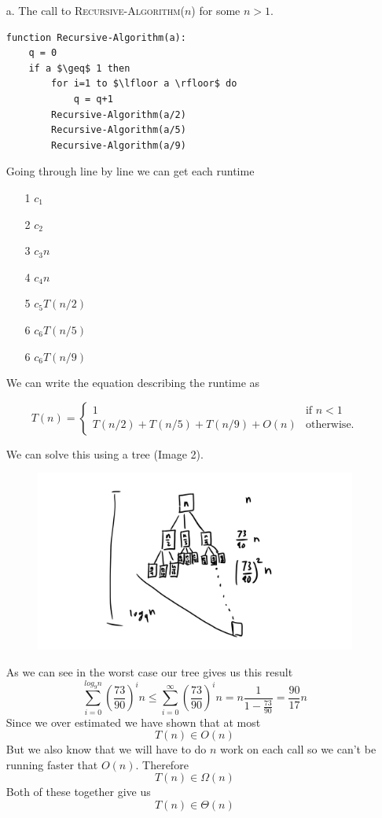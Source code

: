 \documentclass{article}
\begin{document}
\begin{itemize}
\item [a.] The call to \textsc{Recursive-Algorithm}($n$) for some $n>1$.
\vspace{10pt}

\begin{lstlisting}
function Recursive-Algorithm(a):
    q = 0
    if a $\geq$ 1 then
        for i=1 to $\lfloor a \rfloor$ do
            q = q+1
        Recursive-Algorithm(a/2)
        Recursive-Algorithm(a/5)
        Recursive-Algorithm(a/9)
\end{lstlisting}
Going through line by line we can get each runtime
\begin{itemize}
\item [1] $c_{1}$
\item [2] $c_{2}$
\item [3] $c_{3}n$
\item [4] $c_{4}n$
\item [5] $c_{5}T(n/2)$
\item [6] $c_{6}T(n/5)$
\item [6] $c_{6}T(n/9)$
\end{itemize}

We can write the equation describing the runtime as

\begin{equation*}
T(n)=
\begin{cases}
1 &\text{if $n< 1$}\\
T(n/2)+T(n/5)+T(n/9) + O(n) &\text{otherwise.}
\end{cases}
\end{equation*}

We can solve this using a tree (Image 2).
\begin{figure}
    \includegraphics[width=\linewidth]{Image 2.png}
\end{figure}
As we can see in the worst case our tree gives us this result
$$ \sum_{i=0}^{log_{9}{n}}(\frac{73}{90})^in \leq \sum_{i=0}^{\infty}(\frac{73}{90})^in = n\frac{1}{1-\frac{73}{90}} = \frac{90}{17}n $$
Since we over estimated we have shown that at most
$$T(n) \in O(n)$$
But we also know that we will have to do $n$ work on each call so we can't be running faster that $O(n)$. Therefore
$$T(n) \in \Omega(n)$$
Both of these together give us
$$T(n) \in \Theta(n) $$


\end{itemize}
\end{document}
